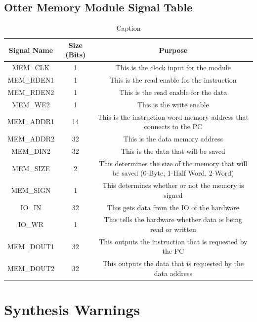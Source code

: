 \documentclass[
    a4paper, %
	12pt, %
    ]{CSSullivanBusinessReport}
\begin{document}
\begin{fullwidth}
\subsection{Otter Memory Module Signal Table}
\begin{adjustbox}{width=\textwidth, center}
\begin{table}
    \begin{tabular}{|c|c|c|} \hline 
        Signal Name&  Size (Bits)& Purpose\\ \hline 
        \hline
        MEM\_CLK&  1& This is the clock input for the module\\ \hline 
        MEM\_RDEN1&  1& This is the read enable for the instruction\\ \hline 
        MEM\_RDEN2&  1& This is the read enable for the data\\ \hline 
        MEM\_WE2&  1& This is the write enable\\ \hline 
        MEM\_ADDR1&  14& This is the instruction word memory address that connects to the PC\\ \hline 
        MEM\_ADDR2&  32& This is the data memory address\\ \hline 
        MEM\_DIN2&  32& This is the data that will be saved\\ \hline 
        MEM\_SIZE&  2& This determines the size of the memory that will be saved (0-Byte, 1-Half Word, 2-Word)\\ \hline 
        MEM\_SIGN&  1& This determines whether or not the memory is signed\\ \hline
        IO\_IN& 32&This gets data from the IO of the hardware\\\hline
        \hline
        IO\_WR& 1&This tells the hardware whether data is being read or written\\\hline
        MEM\_DOUT1& 32&This outputs the instruction that is requested by the PC\\\hline
        MEM\_DOUT2& 32&This outputs the data that is requested by the data address\\\hline
    \end{tabular}
    \caption{Caption}
    \label{tab:my_label}
\end{table}
\end{adjustbox}

\section{Synthesis Warnings} %


\end{fullwidth}
\end{document}
